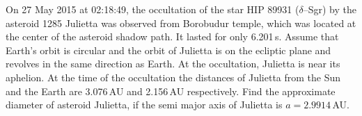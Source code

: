On 27 May 2015 at 02:18:49, the occultation of the star HIP 89931
($\delta$--Sgr) by the asteroid 1285 Julietta was observed from Borobudur
temple, which was located at the center of the asteroid shadow path. It lasted
for only 6.201\,s. Assume that Earth's orbit is circular and the orbit of
Julietta is on the ecliptic plane and revolves in the same direction as Earth.
At the occultation, Julietta is near its aphelion. At the time of the
occultation the distances of Julietta from the Sun and the Earth are
3.076\,AU and 2.156\,AU respectively. Find the approximate diameter of asteroid
Julietta, if the semi major axis of Julietta is $a = 2.9914$\,AU.
